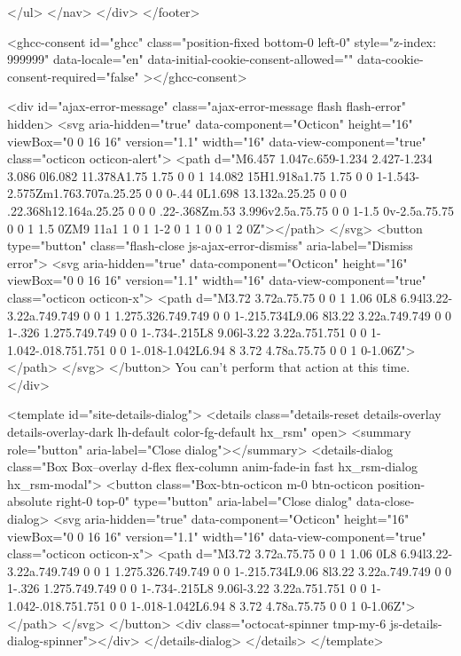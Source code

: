 {{{{{      </ul>
    </nav>
  </div>
</footer>



    <ghcc-consent id="ghcc" class="position-fixed bottom-0 left-0" style="z-index: 999999"
      data-locale="en"
      data-initial-cookie-consent-allowed=""
      data-cookie-consent-required="false"
    ></ghcc-consent>




  <div id="ajax-error-message" class="ajax-error-message flash flash-error" hidden>
    <svg aria-hidden="true" data-component="Octicon" height="16" viewBox="0 0 16 16" version="1.1" width="16" data-view-component="true" class="octicon octicon-alert">
    <path d="M6.457 1.047c.659-1.234 2.427-1.234 3.086 0l6.082 11.378A1.75 1.75 0 0 1 14.082 15H1.918a1.75 1.75 0 0 1-1.543-2.575Zm1.763.707a.25.25 0 0 0-.44 0L1.698 13.132a.25.25 0 0 0 .22.368h12.164a.25.25 0 0 0 .22-.368Zm.53 3.996v2.5a.75.75 0 0 1-1.5 0v-2.5a.75.75 0 0 1 1.5 0ZM9 11a1 1 0 1 1-2 0 1 1 0 0 1 2 0Z"></path>
</svg>
    <button type="button" class="flash-close js-ajax-error-dismiss" aria-label="Dismiss error">
      <svg aria-hidden="true" data-component="Octicon" height="16" viewBox="0 0 16 16" version="1.1" width="16" data-view-component="true" class="octicon octicon-x">
    <path d="M3.72 3.72a.75.75 0 0 1 1.06 0L8 6.94l3.22-3.22a.749.749 0 0 1 1.275.326.749.749 0 0 1-.215.734L9.06 8l3.22 3.22a.749.749 0 0 1-.326 1.275.749.749 0 0 1-.734-.215L8 9.06l-3.22 3.22a.751.751 0 0 1-1.042-.018.751.751 0 0 1-.018-1.042L6.94 8 3.72 4.78a.75.75 0 0 1 0-1.06Z"></path>
</svg>
    </button>
    You can’t perform that action at this time.
  </div>

    <template id="site-details-dialog">
  <details class="details-reset details-overlay details-overlay-dark lh-default color-fg-default hx_rsm" open>
    <summary role="button" aria-label="Close dialog"></summary>
    <details-dialog class="Box Box--overlay d-flex flex-column anim-fade-in fast hx_rsm-dialog hx_rsm-modal">
      <button class="Box-btn-octicon m-0 btn-octicon position-absolute right-0 top-0" type="button" aria-label="Close dialog" data-close-dialog>
        <svg aria-hidden="true" data-component="Octicon" height="16" viewBox="0 0 16 16" version="1.1" width="16" data-view-component="true" class="octicon octicon-x">
    <path d="M3.72 3.72a.75.75 0 0 1 1.06 0L8 6.94l3.22-3.22a.749.749 0 0 1 1.275.326.749.749 0 0 1-.215.734L9.06 8l3.22 3.22a.749.749 0 0 1-.326 1.275.749.749 0 0 1-.734-.215L8 9.06l-3.22 3.22a.751.751 0 0 1-1.042-.018.751.751 0 0 1-.018-1.042L6.94 8 3.72 4.78a.75.75 0 0 1 0-1.06Z"></path>
</svg>
      </button>
      <div class="octocat-spinner tmp-my-6 js-details-dialog-spinner"></div>
    </details-dialog>
  </details>
</template>

}}}}}

